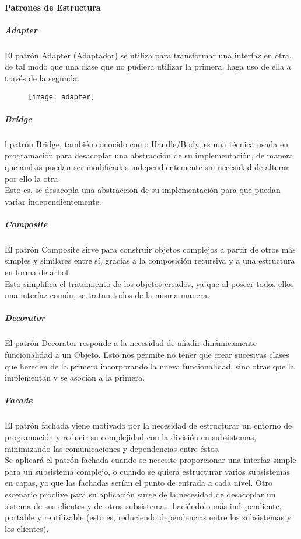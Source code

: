 \paragraph{Patrones de Estructura}
\subparagraph{Adapter}
El patrón Adapter (Adaptador) se utiliza para transformar una interfaz en otra, de tal modo que una clase que no pudiera utilizar la primera, haga uso de ella a través de la segunda.
\begin{figure}[h!]
  \centering{}
    \texttt{[image: adapter]}
\end{figure}
\subparagraph{Bridge}
l patrón Bridge, también conocido como Handle/Body, es una técnica usada en programación para desacoplar una abstracción de su implementación, de manera que ambas puedan ser modificadas independientemente sin necesidad de alterar por ello la otra.\\
Esto es, se desacopla una abstracción de su implementación para que puedan variar independientemente.\\
\vspace*{\fill}
\noindent{}
\subparagraph{Composite}
El patrón Composite sirve para construir objetos complejos a partir de otros más simples y similares entre sí, gracias a la composición recursiva y a una estructura en forma de árbol.\\
Esto simplifica el tratamiento de los objetos creados, ya que al poseer todos ellos una interfaz común, se tratan todos de la misma manera.\\
\vspace*{\fill}
\noindent{}
\subparagraph{Decorator}
El patrón Decorator responde a la necesidad de añadir dinámicamente funcionalidad a un Objeto. Esto nos permite no tener que crear sucesivas clases que hereden de la primera incorporando la nueva funcionalidad, sino otras que la implementan y se asocian a la primera.\\
\vspace*{\fill}
\noindent{}
\subparagraph{Facade}
El patrón fachada viene motivado por la necesidad de estructurar un entorno de programación y reducir su complejidad con la división en subsistemas, minimizando las comunicaciones y dependencias entre éstos.\\
Se aplicará el patrón fachada cuando se necesite proporcionar una interfaz simple para un subsistema complejo, o cuando se quiera estructurar varios subsistemas en capas, ya que las fachadas serían el punto de entrada a cada nivel. Otro escenario proclive para su aplicación surge de la necesidad de desacoplar un sistema de sus clientes y de otros subsistemas, haciéndolo más independiente, portable y reutilizable (esto es, reduciendo dependencias entre los subsistemas y los clientes).\\
